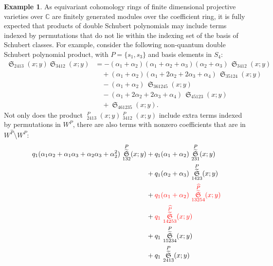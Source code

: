 \documentclass{amsart}
\theoremstyle{definition}
\newtheorem{example}[lemma]{Example}
\theoremstyle{remark}
\numberwithin{equation}{section}
\DeclareMathOperator{\sch}{\mathfrak{S}}
\DeclareMathOperator{\qsch}{\widetilde{\mathfrak{S}}}
\newcommand{\pcomp}[1]{\widehat{#1}}
\begin{document}
\begin{example}
As equivariant cohomology rings of finite dimensional projective varieties over $\mathbb{C}$ are finitely generated modules over the coefficient ring, it is fully expected that products of double Schubert polynomials may include terms indexed by permutations that do not lie within the indexing set of the basis of Schubert classes. For example, consider the following non-quantum double Schubert polynomial product, with $P=\{s_1,s_3\}$ and basis elements in $S_4$:
\begin{align*}
\sch_{2413}(x;y)\sch_{3412}(x;y)
&= - (\alpha_1+\alpha_2)(\alpha_1+\alpha_2+\alpha_3)(\alpha_2+\alpha_3)\,\sch_{3412}(x;y) \\
&\quad + (\alpha_1+\alpha_2)(\alpha_1+2\alpha_2+2\alpha_3+\alpha_4)\,\sch_{35124}(x;y) \\
&\quad - (\alpha_1+\alpha_2)\,\sch_{361245}(x;y) \\
&\quad - (\alpha_1+2\alpha_2+2\alpha_3+\alpha_4)\,\sch_{45123}(x;y) \\
&\quad + \sch_{461235}(x;y).
\end{align*}
Not only does the product $\qsch_{2413}^{P}(x;y)\qsch_{3412}^{P}(x;y)$ include extra terms indexed by permutations in $W^P$, there are also terms with nonzero coefficients that are in $W^{\pcomp{P}}\setminus W^P$:
\begin{align*}
q_1(\alpha_1\alpha_2+\alpha_1\alpha_3+\alpha_2\alpha_3+\alpha_2^2)\,\qsch_{132}^{P}(x;y)
&+ q_1(\alpha_1+\alpha_2)\,\qsch_{231}^{P}(x;y) \\
&+ q_1(\alpha_2+\alpha_3)\,\qsch_{1423}^{P}(x;y) \\
&+ \color{red}{q_1(\alpha_1+\alpha_2)\,\qsch_{13254}^{\pcomp{P}}(x;y)} \\
&+ \color{red}{q_1\,\qsch_{14253}^{\pcomp{P}}(x;y)} \\
&+ q_1\,\qsch_{15234}^{P}(x;y) \\
&+ q_1\,\qsch_{2413}^{P}(x;y)
\end{align*}
\end{example}
\end{document}
